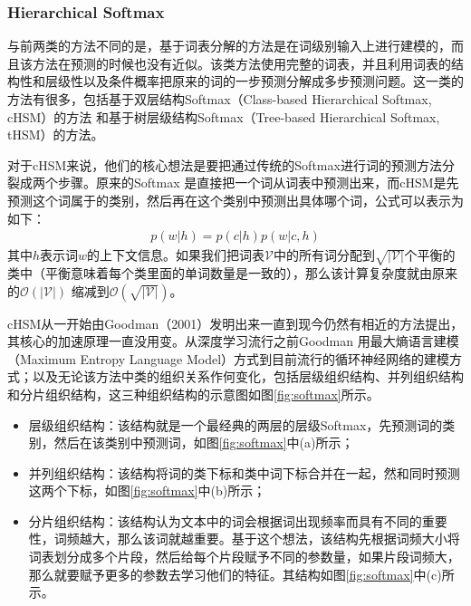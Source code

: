 \documentclass[12pt,a4paper]{article}
\begin{document}
\subsubsection{Hierarchical Softmax}
与前两类的方法不同的是，基于词表分解的方法是在词级别输入上进行建模的，而且该方法在预测的时候也没有近似。该类方法使用完整的词表，并且利用词表的结构性和层级性以及条件概率把原来的词的一步预测分解成多步预测问题。这一类的方法有很多，包括基于双层结构Softmax（Class-based Hierarchical Softmax, cHSM）的方法\cite{DBLP:conf/icassp/Goodman01,DBLP:conf/icassp/MikolovKBCK11,DBLP:conf/acl/ChenGA16,DBLP:conf/icml/GraveJCGJ17} 和基于树层级结构Softmax（Tree-based Hierarchical Softmax, tHSM）的方法\cite{DBLP:conf/aistats/MorinB05,DBLP:conf/nips/MnihH08}。

对于cHSM来说，他们的核心想法是要把通过传统的Softmax进行词的预测方法分裂成两个步骤。原来的Softmax 是直接把一个词从词表中预测出来，而cHSM是先预测这个词属于的类别，然后再在这个类别中预测出具体哪个词，公式可以表示为如下：
\begin{equation}
\label{eq:cHSM}
\begin{split}
	p(w|h)=p(c|h)p(w|c,h)
\end{split}
\end{equation}
其中$h$表示词$w$的上下文信息。如果我们把词表$\mathcal{V}$中的所有词分配到${\sqrt{|\mathcal{V}|}}$个平衡的类中（平衡意味着每个类里面的单词数量是一致的），那么该计算复杂度就由原来的${\mathcal{O}(|\mathcal{V}|)}$ 缩减到${\mathcal{O}(\sqrt{|\mathcal{V}|})}$。

cHSM从一开始由Goodman（2001）发明出来一直到现今仍然有相近的方法提出，其核心的加速原理一直没用变。从深度学习流行之前Goodman 用最大熵语言建模（Maximum Entropy Language Model）方式\cite{DBLP:conf/icassp/Goodman01}到目前流行的循环神经网络的建模方式\cite{DBLP:conf/asru/MikolovDPBC11}；以及无论该方法中类的组织关系作何变化，包括层级组织结构\cite{DBLP:journals/jmlr/BengioDVJ03}、并列组织结构\cite{DBLP:conf/icassp/MikolovKBCK11}和分片组织结构\cite{DBLP:conf/acl/ChenGA16}，这三种组织结构的示意图如图\ref{fig:softmax}所示。
\begin{itemize}
  \item 层级组织结构：该结构就是一个最经典的两层的层级Softmax，先预测词的类别，然后在该类别中预测词，如图\ref{fig:softmax}中(a)所示；
  \item 并列组织结构：该结构将词的类下标和类中词下标合并在一起，然和同时预测这两个下标，如图\ref{fig:softmax}中(b)所示；
  \item 分片组织结构：该结构认为文本中的词会根据词出现频率而具有不同的重要性，词频越大，那么该词就越重要。基于这个想法，该结构先根据词频大小将词表划分成多个片段，然后给每个片段赋予不同的参数量，如果片段词频大，那么就要赋予更多的参数去学习他们的特征。其结构如图\ref{fig:softmax}中(c)所示。
\end{itemize}
\end{document}
